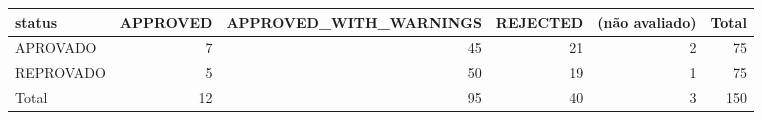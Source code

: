 \begin{tabular}{lrrrrr}
\toprule
status & APPROVED & APPROVED\_WITH\_WARNINGS & REJECTED & (não avaliado) & Total \\
\midrule
APROVADO & 7 & 45 & 21 & 2 & 75 \\
REPROVADO & 5 & 50 & 19 & 1 & 75 \\
Total & 12 & 95 & 40 & 3 & 150 \\
\bottomrule
\end{tabular}
